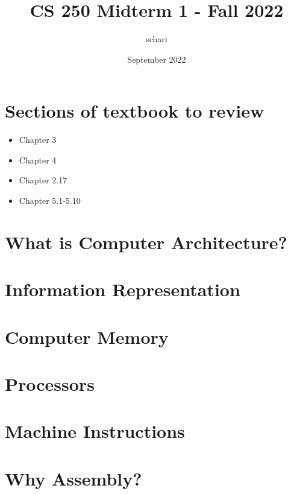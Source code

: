 \documentclass{article}
\title{CS 250 Midterm 1 - Fall 2022}
\author{schari}
\date{September 2022}
\begin{document}
	\maketitle

	\section{Sections of textbook to review}
	\begin{itemize}
		\item Chapter 3
		\item Chapter 4
		\item Chapter 2.17
		\item Chapter 5.1-5.10
	\end{itemize}

	\section{What is Computer Architecture?}

	\section{Information Representation}

	\section{Computer Memory}

	\section{Processors}

	\section{Machine Instructions}

	\section{Why Assembly?}
\end{document}
